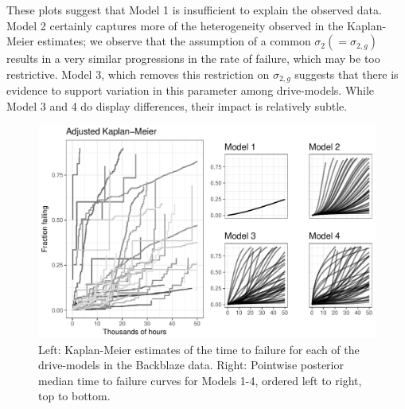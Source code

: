 \documentclass[12pt]{article}
\begin{document}
These plots suggest that Model 1 is insufficient to explain the observed data. Model 2 certainly captures more of the heterogeneity observed in the Kaplan-Meier estimates; we observe that the assumption of a common $\sigma_2(=\sigma_{2,g})$ results in a very similar progressions in the rate of failure, which may be too restrictive. Model 3, which removes this restriction on $\sigma_{2,g}$ suggests that there is evidence to support variation in this parameter among drive-models. While Model 3 and 4 do display differences, their impact is relatively subtle.

\begin{figure}[H]
\includegraphics[width=\textwidth]{heterogeneity-compare}
\caption{Left: Kaplan-Meier estimates of the time to failure for each of the drive-models in the Backblaze data. Right: Pointwise posterior median time to failure curves for Models 1-4, ordered left to right, top to bottom.}
\label{fig:fig2}
\end{figure}
\end{document}
